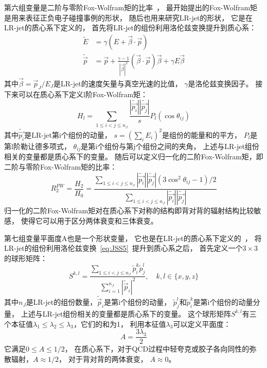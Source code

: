 第六组变量是二阶与零阶Fox-Wolfram矩的比率~\cite{JSS5}，
最开始提出的Fox-Wolfram矩是用来表征正负电子碰撞事例的形状，
随后也用来研究LR-jet的形状，
它是在LR-jet的质心系下定义的，
首先将LR-jet的组份利用洛伦兹变换提升到质心系：
\begin{equation} 
\label{eq:JSS5}
 \begin{split}
 \tilde{E}&=\gamma(E+\vec{\beta}\cdot \vec{p})
\\
\tilde{\vec{p}}&=\vec{p}+\frac{\gamma-1}{|\vec{\beta}|^2} (\vec{\beta}\cdot \vec{p}) \vec{\beta}+\gamma E\vec{\beta}
 \end{split}
\end{equation}
其中$\vec{\beta}=\vec{p}_J/E_J$是LR-jet的速度矢量与真空光速的比值，
$\gamma$是洛伦兹变换因子。
接下来可以在质心系下定义l阶Fox-Wolfram矩：
\begin{equation} 
\label{eq:JSS6}
H_l=\sum_{1\le i<j\le n_J} \frac{|\tilde{\vec{p_i}}| |\tilde{\vec{p_j}}|}{s} P_l (\cos \theta_{ij})
\end{equation}
其中$\tilde{\vec{p_i}}$是LR-jet第i个组份的动量，
$s=(\sum_i E_i)^2$是组份的能量和的平方，
$P_l$是第l阶勒让德多项式，
$\theta_{ij}$是第i个组份与第j个组份之间的夹角，
上述与LR-jet组份相关的变量都是质心系下的变量。
随后可以定义归一化的二阶Fox-Wolfram矩，即二阶与零阶Fox-Wolfram矩的比率：
\begin{equation} 
\label{eq:JSS61}
R_2^{FW}=\frac{H_2}{H_0}=\frac{\sum_{1\le i<j\le n_J} |\tilde{\vec{p_i}}| |\tilde{\vec{p_j}}|  (3\cos^2 \theta_{ij}-1 )/2 }
{\sum_{1\le i<j\le n_J} |\tilde{\vec{p_i}}| |\tilde{\vec{p_j}}|}
\end{equation}
归一化的二阶Fox-Wolfram矩对在质心系下对称的结构即背对背的辐射结构比较敏感，
使得它可以用于区分两体衰变和三体衰变。

第七组变量平面度A也是一个形状变量，
它也是在LR-jet的质心系下定义的~\cite{JSS6}，
将LR-jet的组份利用洛伦兹变换~\ref{eq:JSS5}~提升到质心系之后，
首先定义一个$3\times 3$的球形矩阵：
\begin{equation} 
\label{eq:JSS62}
S^{k,l}=\frac{ \sum_{1\le i<j\le n_J} \tilde{p}_i^k  \tilde{p}_j^l  }
{\sum_{i=1}^{n_J} |\tilde{\vec{p}}_i|^2}
,\quad k,l \in \{x,y,z\}
\end{equation}
其中$n_J$是LR-jet的组份数量，$\tilde{\vec{p}}_i$是第i个组份的动量，
$\tilde{p}_j^l$和$\tilde{p}_i^k$是第i个组份的动量分量，
上述与LR-jet组份相关的变量都是质心系下的变量。
这个球形矩阵$S^{k,l}$有三个本征值$\lambda_1\le \lambda_2\le \lambda_3$，它们的和为1，
利用本征值$\lambda_3$可以定义平面度：
\begin{equation} 
\label{eq:JSS63}
A=\frac{3\lambda_3}{2}
\end{equation}
它满足$0\le A \le 1/2$，
在质心系下，对于QCD过程中轻夸克或胶子各向同性的弥散辐射，$A\approx 1/2$，
对于背对背的两体衰变，%
$A \approx 0$。



